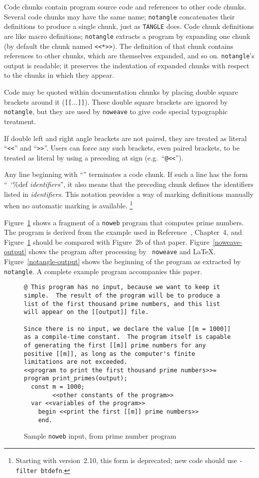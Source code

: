 Code chunks contain program source code and references to other code
chunks.
Several code chunks may have the same name; {\tt notangle}
concatenates their definitions to produce a single chunk, just as
 {\tt TANGLE} does.
Code chunk definitions are like macro definitions;
{\tt notangle} extracts a program by expanding one chunk (by default
the chunk named \verb+<<*>>+).
The definition of that chunk contains references to other chunks,
which are themselves expanded, and so on.
{\tt notangle}'s output is readable; it preserves the indentation of expanded
chunks with respect to the chunks in which they appear.

Code may be quoted within documentation chunks by placing double
square brackets around it ({\tt [[}$\ldots${\tt]]}).
These double square brackets are ignored by {\tt notangle}, but they
are used by {\tt noweave} to give code special typographic
treatment.

If double left and right angle brackets are not paired, they are
treated as literal ``{\tt<<}'' and ``{\tt>>}''.  Users can force any
such brackets, even paired brackets, to be treated as literal by
using a preceding at sign (e.g.~``{\tt @<<}'').

Any line beginning with ``{\tt@ }'' terminates a code chunk.
If such a line has the form
``{\tt@~\char`\%def {\rm\it identifiers}}'',
it also means that the preceding chunk defines the identifiers listed
in {\it identifiers}.
This notation provides a way of marking definitions manually when
no automatic marking is available.%
\footnote{Starting with version~2.10, this form is deprecated; new
code should use \texttt{-filter~btdefn}.}

Figure~\ref{sample-input} shows a fragment of a {\tt noweb} program
that computes prime numbers.
The program is derived from the example used in
Reference~, Chapter~4, and Figure~\ref{sample-input} should
be compared with Figure~2b of that paper.
Figure~\ref{noweave-output} shows the program after processing by {\tt
noweave} and {\LaTeX}.
Figure~\ref{notangle-output} shows the beginning of the program as
extracted by {\tt notangle}.
A complete example program accompanies this paper.

\begin{figure}
\begin{verbatim}
@ This program has no input, because we want to keep it
simple.  The result of the program will be to produce a
list of the first thousand prime numbers, and this list
will appear on the [[output]] file.

Since there is no input, we declare the value [[m = 1000]]
as a compile-time constant.  The program itself is capable
of generating the first [[m]] prime numbers for any
positive [[m]], as long as the computer's finite
limitations are not exceeded.
<<program to print the first thousand prime numbers>>=
program print_primes(output);
  const m = 1000;
        <<other constants of the program>>
  var <<variables of the program>>
    begin <<print the first [[m]] prime numbers>>
    end.
\end{verbatim}
\caption{Sample {\tt noweb} input, from prime number program}
\label{sample-input}
\end{figure}



